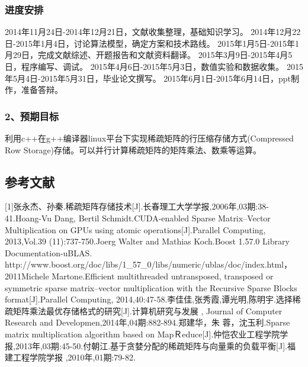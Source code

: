 \documentclass{article}
\begin{document}
      \subsubsection{进度安排}
     2014年11月24日-2014年12月21日，文献收集整理，基础知识学习。\newline
2014年12月22日-2015年1月4日，讨论算法模型，确定方案和技术路线。\newline
2015年1月5日-2015年1月29日，完成文献综述、开题报告和文献资料翻译。\newline
2015年3月9日-2015年4月5日，程序编写、调试。\newline
2015年4月6日-2015年5月3日，数值实验和数据收集。\newline
2015年5月4日-2015年5月31日，毕业论文撰写。\newline
2015年6月1日-2015年6月14日，ppt制作，准备答辩。
\newline



\subsubsection{2、预期目标}  

     利用c++在g++编译器linux平台下实现稀疏矩阵的行压缩存储方式(Compressed Row Storage)存储。可以并行计算稀疏矩阵的矩阵乘法、数乘等运算。
\newline
 
\subsection{参考文献}

  [1]张永杰、孙秦.稀疏矩阵存储技术[J].长春理工大学学报,2006年,03期:38-41.\newline
      [2]Hoang-Vu Dang,  Bertil Schmidt.CUDA-enabled Sparse Matrix–Vector Multiplication on GPUs
using atomic operations[J].Parallel Computing, 2013,Vol.39 (11):737-750.\newline
  [3]Joerg Walter and Mathias Koch.Boost 1.57.0 Library Documentation-uBLAS. http://www.boost.org/doc/libs/1\_57\_0/libs/numeric/ublas/doc/index.html， 2011\newline
  [4]Michele Martone.Efficient multithreaded untransposed, transposed or symmetric sparse matrix–vector multiplication with the Recursive Sparse Blocks format[J].Parallel Computing, 2014,40:47-58.\newline
  [5]李佳佳,张秀霞,谭光明,陈明宇.选择稀疏矩阵乘法最优存储格式的研究[J].计算机研究与发展 , Journal of Computer Research and Developmen,2014年,04期:882-894.\newline
  [6]郑建华，朱 蓉，沈玉利.Sparse matrix multiplication algorithm based on MapＲeduce[J].仲恺农业工程学院学报,2013年,03期:45-50.\newline
[7]付朝江.基于贪婪分配的稀疏矩阵与向量乘的负载平衡[J].福建工程学院学报 ,2010年,01期:79-82.
 \newpage
\end{document}
